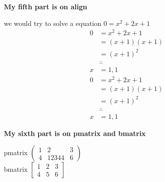 \documentclass{article}
\begin{document}
    \noindent \textbf{My fifth part is on align}


    \noindent we would try to solve a equation $0=x^2+2x+1$
    \begin{align}
        0 &= x^2+2x+1 \\
          &= (x+1)(x+1) \\
          &= (x+1)^2    \\
          & \therefore  \\
        x &= 1 ,1      
    \end{align}
    \begin{align*}
        0 &= x^2+2x+1 \\
          &= (x+1)(x+1) \\
          &= (x+1)^2    \\
          & \therefore  \\
        x &= 1 ,1      
    \end{align*}

    \noindent \textbf{My sixth part is on pmatrix and bmatrix}

    \noindent pmatrix
    $
    \begin{pmatrix}
        1 & 2 &3 \\
        4 &12344&6
    \end{pmatrix}
    $\\
    bmatrix
    $
    \begin{bmatrix}
        1 & 2 &3 \\
        4 &5&6
    \end{bmatrix}
    $
\end{document}
